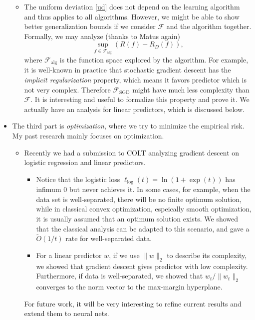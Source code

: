 \documentclass{article}
\theoremstyle{definition}
\theoremstyle{remark}
\begin{document}
\begin{itemize}
\begin{itemize}
        \item The uniform deviation \eqref{ud} does not depend on the learning algorithm and thus applies to all algorithms. However, we might be able to show better generalization bounds if we consider $\mathcal{F}$ and the algorithm together. Formally, we may analyze (thanks to Matus again)
        \begin{equation*}
            \sup_{f\in \mathcal{F}_{\mathrm{alg}}}\left(R(f)-R_D(f)\right),
        \end{equation*}
        where $\mathcal{F}_{\mathrm{alg}}$ is the function space explored by the algorithm. For example, it is well-known in practice that stochastic gradient descent has the \emph{implicit regularization} property, which means it favors predictor which is not very complex. Therefore $\mathcal{F}_{\mathrm{SGD}}$ might have much less complexity than $\mathcal{F}$. It is interesting and useful to formalize this property and prove it. We actually have an analysis for linear predictors, which is discussed below.
    \end{itemize}

    \item The third part is \emph{optimization}, where we try to minimize the empirical risk. My past research mainly focuses on optimization.
    \begin{itemize}
        \item Recently we had a submission to COLT analyzing gradient descent on logistic regression and linear predictors.
        \begin{itemize}
            \item Notice that the logistic loss $\ell_{\mathrm{log}}(t)=\ln\left(1+\exp(t)\right)$ has infimum $0$ but never achieves it. In some cases, for example, when the data set is well-separated, there will be no finite optimum solution, while in classical convex optimization, espeically smooth optimization, it is usually assumed that an optimum solution exists. We showed that the classical analysis can be adapted to this scenario, and gave a $\widetilde{O}(1/t)$ rate for well-separated data.

            \item For a linear predictor $w$, if we use $\|w\|_2$ to describe its complexity, we showed that gradient descent gives predictor with low complexity. Furthermore, if data is well-separated, we showed that $w_t/\|w_t\|_2$ converges to the norm vector to the max-margin hyperplane.
        \end{itemize}
        For future work, it will be very interesting to refine current results and extend them to neural nets.


\end{itemize}
\end{itemize}
\end{document}
